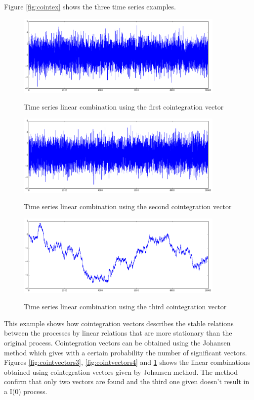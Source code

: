 Figure \ref{fig:cointex} shows the three time series examples.


\begin{figure}[!h]
  \centering
 \begin{minipage}{\textwidth} %
  \centering
  \includegraphics[width=0.9\textwidth]{img/coint-example2} 
   \caption{Time series linear combination using the first cointegration vector }
    \label{fig:cointvectors3}
   \includegraphics[width=0.9\textwidth]{img/coint-example3} 
    \caption{Time series linear combination using the second cointegration vector}
     \label{fig:cointvectors4}
    \includegraphics[width=0.9\textwidth]{img/coint-example4}
 \caption{Time series linear combination using the third cointegration vector}
   \label{fig:cointvectors5}
\end{minipage}
\end{figure}


This example shows how cointegration vectors describes the stable relations
between the processes by linear relations that are more stationary than the
original process. Cointegration vectors can be obtained using the Johansen
method which gives with a certain probability the number of significant vectors.
Figures \ref{fig:cointvectors3}, \ref{fig:cointvectors4}  and
\ref{fig:cointvectors5}  shows the linear combinations obtained using
cointegration vectors given by Johansen method. The method confirm that only two
vectors are found and the third one given doesn't result in a I(0) process.
\vfill

